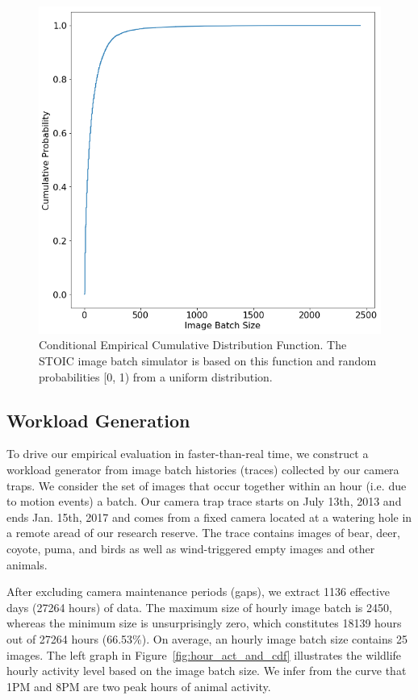 { 
\begin{figure}[t] \centering 
\includegraphics[scale=0.4]{figures/ecdf.png}
\caption{Conditional Empirical Cumulative Distribution Function. The STOIC image batch simulator is based on this function and random probabilities [0, 1) from a uniform distribution.
\label{fig:cecdf}}
\end{figure} 
}
 
\subsection{Workload Generation}
\label{sec:workloadgen}

To drive our empirical evaluation in faster-than-real time, 
we construct a workload generator
from image batch histories (traces) collected by our camera traps.
We consider the set of images that occur together within an hour
(i.e. due to motion events) a batch.
Our camera trap trace starts on
July 13th, 2013 and ends Jan. 15th, 2017 and comes from a fixed camera
located at a watering hole in a remote aread of our research reserve. 
The trace contains images of bear, deer, coyote, puma, and birds as well
as wind-triggered empty images and other animals.

After excluding camera maintenance periods (gaps), we 
extract 1136 effective days (27264
hours) of data. The maximum size of hourly image batch is 2450, whereas the
minimum size is unsurprisingly zero, which constitutes 18139 hours out of 27264
hours (66.53\%). On average, an hourly image batch size contains 25 images.
The left graph in Figure~\ref{fig:hour_act_and_cdf} illustrates the wildlife 
hourly activity level based
on the image batch size. We infer from the curve that 1PM and 8PM are two peak
hours of animal activity.

